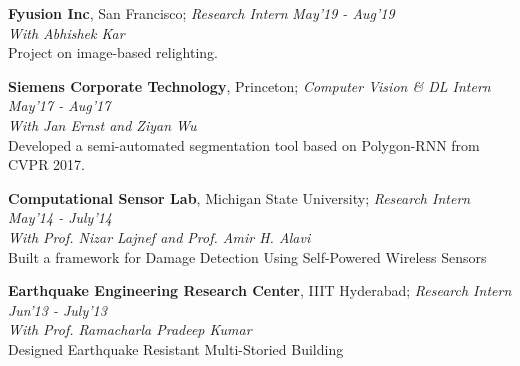 \documentclass[margin,line]{res}
\newenvironment{list2}{
  \begin{list}{$\bullet$}{%
      \setlength{\itemsep}{0in}
      \setlength{\parsep}{0in} \setlength{\parskip}{0in}
      \setlength{\topsep}{0in} \setlength{\partopsep}{0in} 
      \setlength{\leftmargin}{0.2in}}}{\end{list}}
\begin{document}
\begin{resume}
{\bf Fyusion Inc},  San Francisco; {\em Research Intern}  \hfill  {\em May'19 - Aug'19}\\
{\em With Abhishek Kar}\\
Project on image-based relighting.

{\bf Siemens Corporate Technology}, Princeton; {\em Computer Vision \& DL Intern}  \hfill  {\em May'17 - Aug'17}\\
{\em With Jan Ernst and Ziyan Wu}\\
Developed a semi-automated segmentation tool based on Polygon-RNN from CVPR 2017. 

{\bf Computational Sensor Lab}, {Michigan State University}; {\em Research Intern} \hfill {\em May'14 - July'14} \\
{\em With Prof. Nizar Lajnef and Prof. Amir H. Alavi}\\
Built a framework for Damage Detection Using Self-Powered Wireless Sensors

{\bf Earthquake Engineering Research Center}, {IIIT Hyderabad}; {\em Research Intern} \hfill {\em Jun'13 - July'13} \\
{\em With Prof. Ramacharla Pradeep Kumar}\\
Designed Earthquake Resistant Multi-Storied Building

\end{resume}
\end{document}
